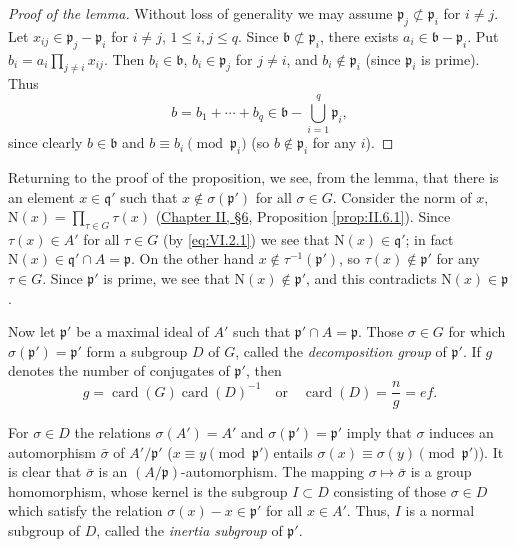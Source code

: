 \begin{proof}[Proof of the lemma]
Without loss of generality we may assume
$\mathfrak{p}_{j}\not\subset\mathfrak{p}_{i}$ for $i\neq j$. Let
$x_{ij}\in\mathfrak{p}_{j}-\mathfrak{p}_{i}$ for $i\neq j$,
$1\leq i,j\leq q$. Since $\mathfrak{b}\not\subset\mathfrak{p}_{i}$, there
exists $a_{i}\in\mathfrak{b}-\mathfrak{p}_{i}$. Put
$b_{i}=a_{i}\prod_{j\neq i}x_{ij}$. Then $b_{i}\in\mathfrak{b}$,
$b_{i}\in\mathfrak{p}_{j}$ for $j\neq i$, and
$b_{i}\notin\mathfrak{p}_{i}$ (since $\mathfrak{p}_{i}$ is prime). Thus
\[
b=b_{1}+\cdots+b_{q}\in\mathfrak{b}-\bigcup_{i=1}^{q}\mathfrak{p}_{i},
\]
since clearly $b\in\mathfrak{b}$ and
$b\equiv b_{i}\pmod{\mathfrak{p}_{i}}$ (so $b\notin\mathfrak{p}_{i}$ for
any $i$).
\end{proof}

Returning to the proof of the proposition, we see, from the lemma, that
there is an element $x\in\mathfrak{q}'$ such that
$x\notin\sigma(\mathfrak{p}')$ for all $\sigma\in G$. Consider the norm of
$x$, $\mathrm{N}(x)=\prod_{\tau\in G}\tau(x)$ (\hyperref[sec:2.6]{Chapter II, §6},
Proposition \ref{prop:II.6.1}). Since $\tau(x)\in A'$ for all $\tau\in G$
(by \eqref{eq:VI.2.1}) we see that $\mathrm{N}(x)\in\mathfrak{q}'$; in
fact $\mathrm{N}(x)\in\mathfrak{q}'\cap A=\mathfrak{p}$. On the other
hand $x\notin\tau^{-1}(\mathfrak{p}')$, so
$\tau(x)\notin\mathfrak{p}'$ for any $\tau\in G$. Since
$\mathfrak{p}'$ is prime, we see that
$\mathrm{N}(x)\notin\mathfrak{p}'$, and this contradicts
$\mathrm{N}(x)\in\mathfrak{p}$.

Now let $\mathfrak{p}'$ be a maximal ideal of $A'$ such that
$\mathfrak{p}'\cap A=\mathfrak{p}$. Those $\sigma\in G$ for which
$\sigma(\mathfrak{p}')=\mathfrak{p}'$ form a subgroup $D$ of $G$, called
the \emph{decomposition group} of $\mathfrak{p}'$. If $g$ denotes the
number of conjugates of $\mathfrak{p}'$, then
\begin{equation}
g=\operatorname{card}(G)\operatorname{card}(D)^{-1}
\quad\text{or}\quad
\operatorname{card}(D)=\frac{n}{g}=ef.
\label{eq:VI.2.2}
\end{equation}

For $\sigma\in D$ the relations $\sigma(A')=A'$ and
$\sigma(\mathfrak{p}')=\mathfrak{p}'$ imply that $\sigma$ induces an
automorphism $\bar{\sigma}$ of $A'/\mathfrak{p}'$
($x\equiv y\pmod{\mathfrak{p}'}$ entails
$\sigma(x)\equiv\sigma(y)\pmod{\mathfrak{p}'}$). It is clear that
$\bar{\sigma}$ is an $(A/\mathfrak{p})$-automorphism. The mapping
$\sigma\mapsto\bar{\sigma}$ is a group homomorphism, whose kernel is the
subgroup $I\subset D$ consisting of those $\sigma\in D$ which satisfy the
relation $\sigma(x)-x\in\mathfrak{p}'$ for all $x\in A'$. Thus, $I$ is a
normal subgroup of $D$, called the \emph{inertia subgroup} of
$\mathfrak{p}'$.

